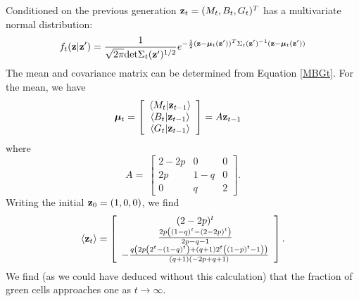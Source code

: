 \documentclass{article}
\newcommand{\bz}{{\bf z}}
\newcommand{\bmu}{{\boldsymbol \mu}}
\begin{document}
Conditioned on the previous generation ${\bf z}_t = (M_t,B_t,G_t)^T$ has a multivariate normal distribution: 
\begin{align}
f_t(\bz|\bz') = \frac{1}{\sqrt{2\pi } {\rm det}\Sigma_{t}(\bz')^{1/2}} e^{-\frac{1}{2}(\bz-\bmu_{t}(\bz'))^T\Sigma_{t}(\bz')^{-1}(\bz-\bmu_{t}(\bz'))}
\end{align}
The mean and covariance matrix can be determined from Equation \eqref{MBGt}. For the mean, we have
\begin{align}
\bmu_{t} &= \left[\begin{array}{c}
 \langle  M_t |\bz_{t-1}\rangle \\
 \langle  B_t |\bz_{t-1}\rangle \\
 \langle  G_t |\bz_{t-1}\rangle 
 \end{array}
\right]
= A \bz_{t-1} 
\end{align}
where
\begin{equation}
A=\
\left[ \begin{array}{ccc}
2 -2p & 0 &0 \\
2p & 1-q & 0 \\
0 & q & 2
\end{array}\right].
\end{equation}
Writing the initial $\bz_0 = (1,0,0)$, we find 
\begin{equation}
\langle \bz_t \rangle  = \left[
\begin{array}{c}
 (2-2 p)^t \\
 \frac{2 p \left((1-q)^t-(2-2 p)^t\right)}{2 p-q-1} \\
 -\frac{q \left(2 p \left(2^t-(1-q)^t\right)+(q+1) 2^t \left((1-p)^t-1\right)\right)}{(q+1) (-2 p+q+1)} \\
\end{array}
\right].
\end{equation}
We find (as we could have deduced without this calculation) that the fraction of green cells approaches one as $t \to \infty$. 
\end{document}
